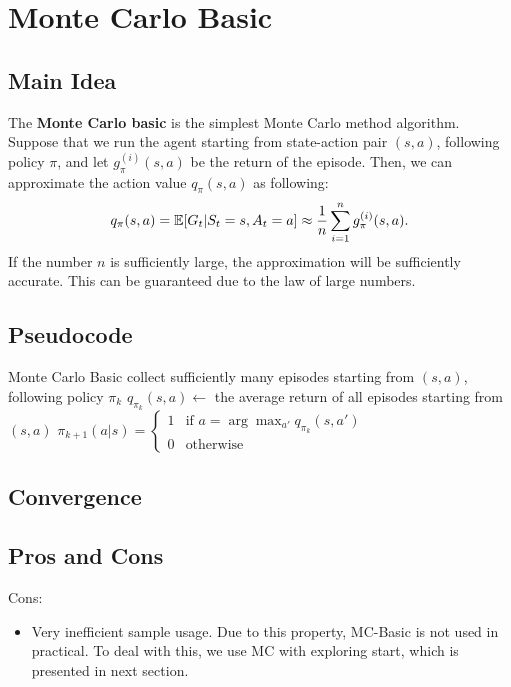 \section{Monte Carlo Basic}
    \subsection{Main Idea}
        The \textbf{Monte Carlo basic} is the simplest Monte Carlo method algorithm.
        Suppose that we run the agent starting from state-action pair $(s,a)$, following policy $\pi$, and let $g_\pi^{(i)}(s,a)$
        be the return of the episode. Then, we can approximate the action value $q_\pi(s,a)$ as following:
        \begin{equation}
            q_\pi(s,a) = \mathbb{E}[G_t|S_t=s,A_t=a] \approx \frac{1}{n} \sum_{i=1}^n g_\pi^{(i)}(s,a).
        \end{equation}
        If the number $n$ is sufficiently large, the approximation will be sufficiently accurate. This can be guaranteed due to the law of large numbers.
    \subsection{Pseudocode}
        {Monte Carlo Basic}
        {
        }
        {
        }
        {
            {
                {
                    {
                        collect sufficiently many episodes starting from $(s,a)$, following policy $\pi_k$\;
                        $q_{\pi_k}(s,a) \leftarrow$ the average return of all episodes starting from $(s,a)$\;
                    }
                }
                $\pi_{k+1}(a|s) = \begin{cases}
                    1 &\text{if $a=\arg\max_{a'}{q_{\pi_k}(s,a')}$} \\
                    0 &\text{otherwise}
                \end{cases}$\;
            }
            \Return{$\pi$}
        }
    \subsection{Convergence}
    \subsection{Pros and Cons}
        Cons:
        \begin{itemize}
            \item Very inefficient sample usage. Due to this property, MC-Basic is not used in practical.
                To deal with this, we use MC with exploring start, which is presented in next section.
        \end{itemize}